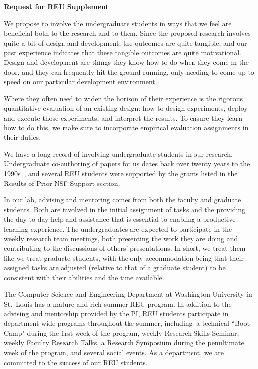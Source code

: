 \documentclass[11pt]{article}
\begin{document}
\pagestyle{empty}
\thispagestyle{empty}

\begin{center}
\textbf{\Large Request for REU Supplement}
\end{center}

We propose to involve the undergraduate students in ways that we feel
are beneficial both to the research and to them.  Since the proposed
research involves quite a bit of design and development, the outcomes
are quite tangible, and our past experience indicates that these
tangible outcomes are quite motivational.  Design and development
are things they know how to do when they come in the door, and they
can frequently hit the ground running, only needing to come up to speed
on our particular development environment.

Where they often need to widen the horizon of their experience is the
rigorous quantitative evaluation of an existing design:
how to design experiments, deploy and execute those experiments,
and interpret the results.
To ensure they learn how to do this, we make sure
to incorporate empirical evaluation assignments in their duties.

We have a long record of involving undergraduate students in our research.
Undergraduate co-authoring of papers for us dates back 
over twenty years to the
1990s~\cite{ch94}, and several REU students were supported by the grants
listed in the Results of Prior NSF Support section.

In our lab, advising and mentoring comes from both the faculty and graduate
students. Both are involved in the initial assignment of tasks and
the providing the day-to-day help and assistance that is essential to
enabling a productive learning experience.  The undergraduates are
expected to participate in the weekly research team meetings, both
presenting the work they are doing and contributing to the discussions
of others' presentations.  In short, we treat them like we treat graduate
students, with the only accommodation being that their assigned tasks
are adjusted (relative to that of a graduate student) to be consistent
with their abilities and the time available.

The Computer Science and Engineering Department at Washington University
in St.~Louis has a mature and rich summer REU program. In addition to
the advising and mentorship provided by the PI, REU students participate
in department-wide programs throughout the summer, including:
a technical ``Boot Camp" during the first week of the program,
weekly Research Skills Seminar, weekly Faculty Research Talks,
a Research Symposium during the penultimate week of the program,
and several social events.
As a department, we are committed to the success of our REU students.
\end{document}
